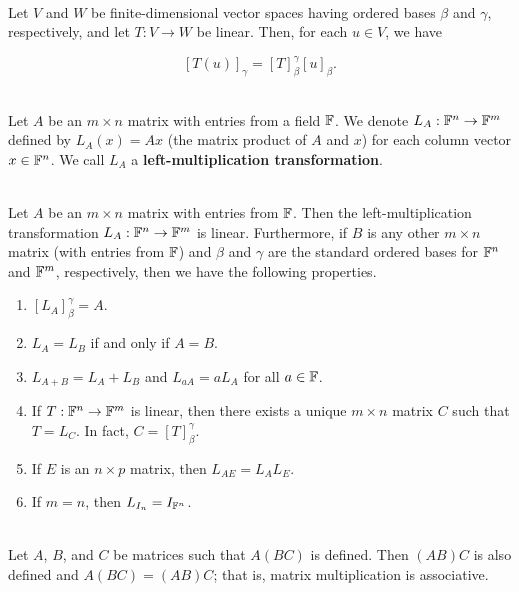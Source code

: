 \begin{theorem}
	\hfill\\
	Let $V$ and $W$ be finite-dimensional vector spaces having ordered bases $\beta$  and $\gamma$, respectively, and let $T: V \to W$ be linear. Then, for each $u \in V$, we have
	
	\[[T(u)]_\gamma = [T]_\beta^\gamma [u]_\beta.\]
\end{theorem}

\begin{definition}
	\hfill\\
	Let $A$ be an $m \times n$ matrix with entries from a field $\mathbb{F}$. We denote $L_A: \mathbb{F}^n \to \mathbb{F}^m$ defined by $L_A(x) = Ax$ (the matrix product of $A$ and $x$) for each column vector $x \in \mathbb{F}^n$. We call $L_A$ a \textbf{left-multiplication transformation}.
\end{definition}

\begin{theorem}
	\hfill\\
	Let $A$ be an $m \times n$ matrix with entries from $\mathbb{F}$. Then the left-multiplication transformation $L_A: \mathbb{F}^n \to \mathbb{F}^m$ is linear. Furthermore, if $B$ is any other $m \times n$ matrix (with entries from $\mathbb{F}$) and $\beta$ and $\gamma$ are the standard ordered bases for $\mathbb{F}^n$ and $\mathbb{F}^m$, respectively, then we have the following properties.
	
	\begin{enumerate}
		\item $[L_A]_\beta^\gamma = A$.
		\item $L_A = L_B$ if and only if $A = B$.
		\item $L_{A + B} = L_A + L_B$ and $L_{aA} = aL_A$ for all $a \in \mathbb{F}$.
		\item If $T: \mathbb{F}^n \to \mathbb{F}^m$ is linear, then there exists a unique $m \times n$ matrix $C$ such that $T = L_C$. In fact, $C = [T]_\beta^\gamma$.
		\item If $E$ is an $n \times p$ matrix, then $L_{AE} = L_AL_E$.
		\item If $m = n$, then $L_{I_n} = I_{\mathbb{F}^n}$.
	\end{enumerate}
\end{theorem}

\begin{theorem}
	\hfill\\
	Let $A$, $B$, and $C$ be matrices such that $A(BC)$ is defined. Then $(AB)C$ is also defined and $A(BC)=(AB)C$; that is, matrix multiplication is associative.
\end{theorem}

